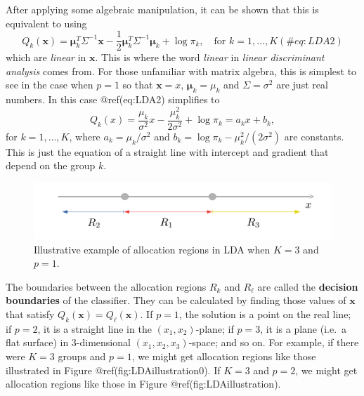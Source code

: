 \documentclass[
]{article}
\begin{document}
After applying some algebraic manipulation, it can be shown that this is
equivalent to using \begin{equation}
Q_k(\boldsymbol{x}) = \boldsymbol{\mu}_k^T \Sigma^{-1} \boldsymbol{x} - \frac{1}{2} \boldsymbol{\mu}_k^T \Sigma^{-1} \boldsymbol{\mu}_k + \log \pi_k, \quad \text{for $k=1,\ldots,K$}(\#eq:LDA2)
\end{equation} which are \emph{linear} in \(\boldsymbol{x}\). This is
where the word \emph{linear} in \emph{linear discriminant analysis}
comes from. For those unfamiliar with matrix algebra, this is simplest
to see in the case when \(p=1\) so that \(\boldsymbol{x}=x\),
\(\boldsymbol{\mu}_k = \mu_k\) and \(\Sigma = \sigma^2\) are just real
numbers. In this case @ref(eq:LDA2) simplifies to \begin{equation*}
Q_k(x) = \frac{\mu_k}{\sigma^2} x - \frac{\mu_k^2}{2 \sigma^2} + \log \pi_k = a_k x + b_k,
\end{equation*} for \(k=1,\ldots,K\), where \(a_k = \mu_k / \sigma^2\)
and \(b_k = \log \pi_k - \mu_k^2 / (2 \sigma^2)\) are constants. This is
just the equation of a straight line with intercept and gradient that
depend on the group \(k\).

\begin{figure}[tb]

{\centering \includegraphics[width=0.7\linewidth]{LDA} 

}

\caption{Illustrative example of allocation regions in LDA when $K=3$ and $p=1$.}\label{fig:LDAillustration0}
\end{figure}

The boundaries between the allocation regions \(R_k\) and \(R_{\ell}\)
are called the \textbf{decision boundaries} of the classifier. They can
be calculated by finding those values of \(\boldsymbol{x}\) that satisfy
\(Q_k(\boldsymbol{x}) = Q_\ell(\boldsymbol{x})\). If \(p=1\), the
solution is a point on the real line; if \(p=2\), it is a straight line
in the \((x_1, x_2)\)-plane; if \(p=3\), it is a plane (i.e.~a flat
surface) in 3-dimensional \((x_1, x_2, x_3)\)-space; and so on. For
example, if there were \(K=3\) groups and \(p=1\), we might get
allocation regions like those illustrated in Figure
@ref(fig:LDAillustration0). If \(K=3\) and \(p=2\), we might get
allocation regions like those in Figure @ref(fig:LDAillustration).
\end{document}
